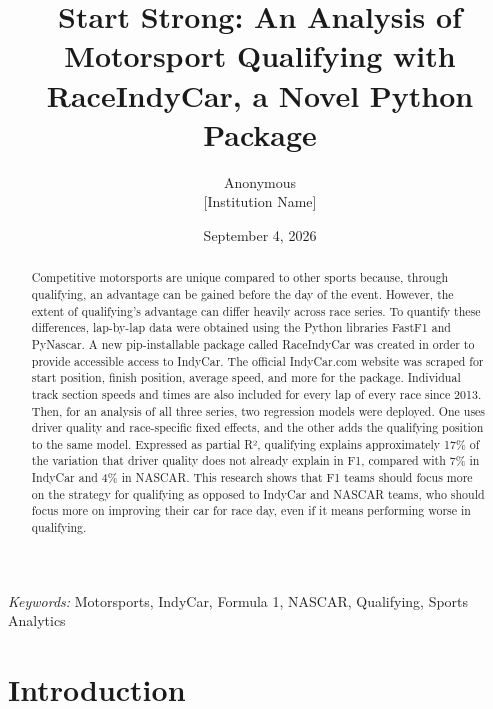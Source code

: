 \documentclass[
  10pt]{article}
\begin{document}
\def\spacingset#1{\renewcommand{\baselinestretch}%
{#1}\small\normalsize} \spacingset{1}



\date{September 4, 2026}
\title{\bf Start Strong: An Analysis of Motorsport Qualifying with
RaceIndyCar, a Novel Python Package}
\author{
Anonymous\\
{[}Institution Name{]}\\
}
\maketitle

\bigskip
\bigskip
\begin{abstract}
Competitive motorsports are unique compared to other sports because,
through qualifying, an advantage can be gained before the day of the
event. However, the extent of qualifying's advantage can differ heavily
across race series. To quantify these differences, lap-by-lap data were
obtained using the Python libraries FastF1 and PyNascar. A new
pip-installable package called RaceIndyCar was created in order to
provide accessible access to IndyCar. The official IndyCar.com website
was scraped for start position, finish position, average speed, and more
for the package. Individual track section speeds and times are also
included for every lap of every race since 2013. Then, for an analysis
of all three series, two regression models were deployed. One uses
driver quality and race-specific fixed effects, and the other adds the
qualifying position to the same model. Expressed as partial R²,
qualifying explains approximately 17\% of the variation that driver
quality does not already explain in F1, compared with 7\% in IndyCar and
4\% in NASCAR. This research shows that F1 teams should focus more on
the strategy for qualifying as opposed to IndyCar and NASCAR teams, who
should focus more on improving their car for race day, even if it means
performing worse in qualifying.
\end{abstract}

\noindent%
{\it Keywords:} Motorsports, IndyCar, Formula
1, NASCAR, Qualifying, Sports Analytics
\vfill

\spacingset{1} %


\section{Introduction}\label{introduction}
\end{document}
